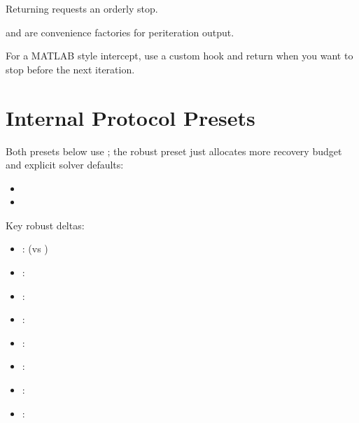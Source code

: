 \documentclass[letterpaper,10pt,english]{sphinxmanual}
\begin{document}
\sphinxAtStartPar
Returning  requests an orderly stop.

\sphinxAtStartPar
{} and 
are convenience factories for per\sphinxhyphen{}iteration output.

\sphinxAtStartPar
For a MATLAB \sphinxhyphen{}style intercept, use a custom hook and return 
when you want to stop before the next iteration.


\section{Internal Protocol Presets}
\label{\detokenize{optima_algorithms:internal-protocol-presets}}
\sphinxAtStartPar
Both presets below use ; the robust preset
just allocates more recovery budget and explicit solver defaults:
\begin{itemize}
\item {} 
\sphinxAtStartPar
{}

\item {} 
\sphinxAtStartPar
{}

\end{itemize}

\sphinxAtStartPar
Key robust deltas:
\begin{itemize}
\item {} 
\sphinxAtStartPar
{}:  (vs )

\item {} 
\sphinxAtStartPar
{}: 

\item {} 
\sphinxAtStartPar
{}: 

\item {} 
\sphinxAtStartPar
{}: 

\item {} 
\sphinxAtStartPar
{}: 

\item {} 
\sphinxAtStartPar
{}: 

\item {} 
\sphinxAtStartPar
{}: 

\item {} 
\sphinxAtStartPar
{}: 

\end{itemize}
\end{document}
